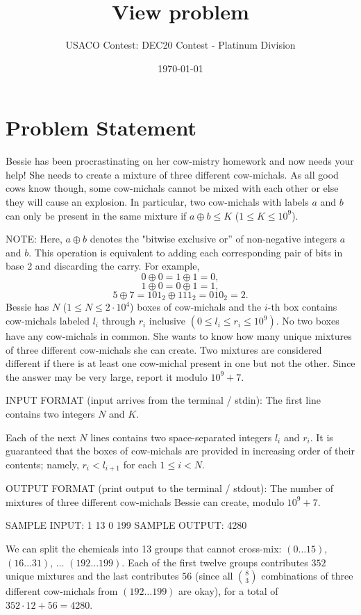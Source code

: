 \documentclass[12pt]{article}
\title{View problem}
\author{USACO Contest: DEC20 Contest - Platinum Division}
\date{\today}
\begin{document}
\maketitle

\section*{Problem Statement}

Bessie has been procrastinating on her cow-mistry homework and now needs your
help! She needs to create a mixture of three different cow-michals. As all good
cows know though, some cow-michals cannot be mixed with each other or else they
will cause an explosion. In particular, two cow-michals with labels $a$ and $b$
can only be present in the same mixture if $a \oplus b \le K$
($1 \le K \le 10^9$).

NOTE: Here, $a\oplus b$ denotes the "bitwise exclusive or'' of non-negative
integers $a$ and $b$. This operation is equivalent to adding each corresponding
pair of bits in base 2 and discarding the carry. For example, 
$$0\oplus 0=1\oplus 1=0,$$
$$1\oplus 0=0\oplus 1=1,$$
$$5\oplus 7=101_2\oplus 111_2=010_2=2.$$
Bessie has $N$ ($1\le N\le 2\cdot 10^4$) boxes of cow-michals and the $i$-th box contains cow-michals
labeled $l_i$ through $r_i$ inclusive $(0\le l_i \le r_i \le 10^9)$. No two
boxes have any cow-michals in common. She wants to know how many unique mixtures
of three different cow-michals she can create. Two mixtures are considered
different if there is at least one cow-michal present in one but not the other.
Since the answer may be very large, report it modulo $10^9 + 7$.

INPUT FORMAT (input arrives from the terminal / stdin):
The first line contains two integers $N$ and $K$.

Each of the next $N$ lines contains two space-separated integers $l_i$ and
$r_i$. It is guaranteed that the boxes of cow-michals are provided in increasing
order of their contents; namely, $r_i<l_{i+1}$ for each $1\le i<N$.

OUTPUT FORMAT (print output to the terminal / stdout):
The number of mixtures of three different cow-michals Bessie can create, modulo
$10^9 + 7$.

SAMPLE INPUT:
1 13
0 199
SAMPLE OUTPUT: 
4280

We can split the chemicals into 13 groups that cannot cross-mix: $(0\ldots 15)$,
$(16\ldots 31)$,  $\ldots$ $(192\ldots 199)$. Each of the first twelve groups
contributes $352$ unique mixtures and the last contributes $56$ (since all
$\binom{8}{3}$ combinations of three different cow-michals from
$(192\ldots 199)$ are okay), for a total of
$352\cdot 12+56=4280$.
\end{document}
